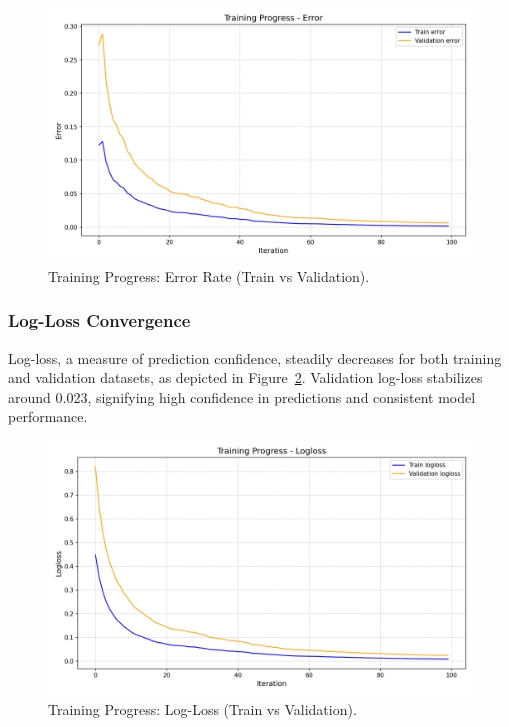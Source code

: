 \documentclass[
    13pt, %
    a4paper, %
    listof=totoc, %
    bibliography=totoc, %
    index=totoc, %
    headsepline
]{scrreprt}
\begin{document}
\begin{figure}[H]
    \centering
    \includegraphics[width=\textwidth]{training_progress_error.png}
    \caption{Training Progress: Error Rate (Train vs Validation).}
    \label{fig:training_progress_error}
\end{figure}

\subsubsection{Log-Loss Convergence}
\noindent
Log-loss, a measure of prediction confidence, steadily decreases for both training and validation datasets, as depicted in Figure~\ref{fig:training_progress_logloss}. Validation log-loss stabilizes around 0.023, signifying high confidence in predictions and consistent model performance.

\begin{figure}[H]
    \centering
    \includegraphics[width=\textwidth]{training_progress_logloss.png}
    \caption{Training Progress: Log-Loss (Train vs Validation).}
    \label{fig:training_progress_logloss}
\end{figure}
\end{document}
